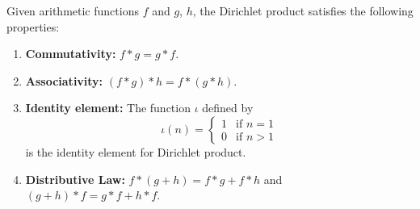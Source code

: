 \begin{prop}\label{prop:dirprod}
    Given arithmetic functions $f$ and $g$, $h$, the Dirichlet product satisfies the following properties:
    \begin{enumerate}
        \item \textbf{Commutativity:} $f \ast g = g \ast f$.
        \item \textbf{Associativity:} $(f \ast g) \ast h = f \ast (g \ast h)$.
        \item \textbf{Identity element:} The function $\iota$ defined by \[\iota(n) = \begin{cases}
            1 & \text{if } n = 1 \\
            0 & \text{if } n > 1
        \end{cases}\] is the identity element for Dirichlet product.
        \item \textbf{Distributive Law:} $f \ast (g + h) = f \ast g + f \ast h$ and $(g + h) \ast f = g \ast f + h \ast f$.
    \end{enumerate}
\end{prop}
